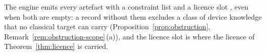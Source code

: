 
\begin{requirement}\label{req:constraint-and-licence-slots}
The engine emits every artefact with a constraint list
 and a licence slot , even
when both are empty: a record without them excludes a class of device
knowledge that no classical target can carry
(Proposition~\ref{prop:obstruction}, Remark~\ref{rem:obstruction-scope}\,(a)),
and the licence slot is where the licence of Theorem~\ref{thm:licence} is
carried.
\end{requirement}
